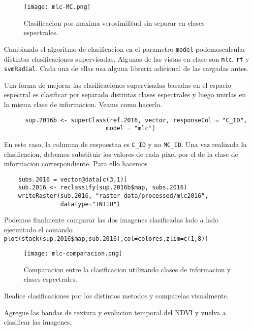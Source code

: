 \begin{figure}
  \texttt{[image: mlc-MC.png]}
  \caption{Clasificacion por maxima verosimilitud sin separar en clases espectrales.}
  \label{fig:MC}
\end{figure}

Cambiando el algoritmo de clasificacion en el parametro \texttt{model} podemoscalcular distintas clasificaciones supervisadas. Algunas de las vistas en clase son \texttt{mlc}, \texttt{rf} y \texttt{svmRadial}. Cada una de ellas usa alguna libreria adicional de las cargadas antes.

\begin{exa}
  Una forma de mejorar las clasificaciones supervisadas basadas en el espacio espectral es clasificar por separado distintas clases espectrales y luego unirlas en la misma clase de informacion. Veams como hacerlo.

  \begin{lstlisting}
      sup.2016b <- superClass(ref.2016, vector, responseCol = "C_ID",
                             model = "mlc")
  \end{lstlisting}

  En este caso, la columna de respuestaa es \texttt{C\_ID} y no \texttt{MC\_ID}.  Una vez realizada la clasificacion, debemos substituir los valores de cada pixel por el de la clase de informacion correspondiente. Para ello hacemos

  \begin{lstlisting}
    subs.2016 = vector@data[c(3,1)]
    sub.2016 <- reclassify(sup.2016b$map, subs.2016)
    writeRaster(sub.2016, "raster_data/processed/mlc2016",
                datatype="INT1U")
  \end{lstlisting}

    Podemos finalmente comparar las dos imagenes clasificadas lado a lado ejecuntado el comando \verb|plot(stack(sup.2016$map,sub.2016),col=colores,zlim=c(1,8))|
    \begin{figure}
      \texttt{[image: mlc-comparacion.png]}
      \caption{Comparacion entre la clasificacion utilizando clases de informacion y clases espectrales.}
      \label{fig:mlc}
    \end{figure}
\end{exa}

\begin{act}
    Realice clasificaciones por los distintos metodos y comparelas visualmente.
\end{act}

\begin{act}
    Agregue las bandas de textura y evolucion temporal del NDVI y vuelva a clasificar las imagenes.
\end{act}

